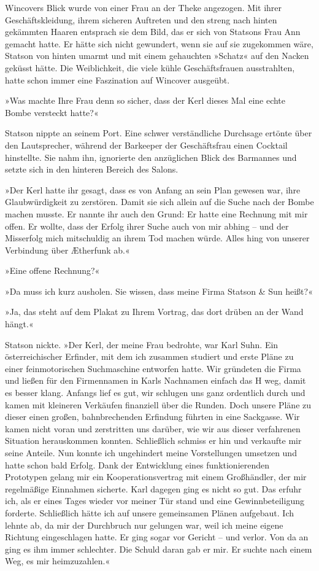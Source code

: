 \bigpar

Wincovers Blick wurde von einer Frau an der Theke angezogen. Mit
ihrer Geschäftskleidung, ihrem sicheren Auftreten und den streng
nach hinten gekämmten Haaren entsprach sie dem Bild, das er sich
von Statsons Frau Ann gemacht hatte. Er hätte sich nicht gewundert,
wenn sie auf sie zugekommen wäre, Statson von hinten umarmt und mit
einem gehauchten »Schatz« auf den Nacken geküsst hätte. Die
Weiblichkeit, die viele kühle Geschäftsfrauen ausstrahlten, hatte
schon immer eine Faszination auf Wincover ausgeübt.

»Was machte Ihre Frau denn so sicher, dass der Kerl dieses Mal eine
echte Bombe versteckt hatte?«

Statson nippte an seinem Port. Eine schwer verständliche Durchsage
ertönte über den Lautsprecher, während der Barkeeper der
Geschäftsfrau einen Cocktail hinstellte. Sie nahm ihn, ignorierte
den anzüglichen Blick des Barmannes und setzte sich in den hinteren
Bereich des Salons.

»Der Kerl hatte ihr gesagt, dass es von Anfang an sein Plan gewesen
war, ihre Glaubwürdigkeit zu zerstören. Damit sie sich allein auf
die Suche nach der Bombe machen musste. Er nannte ihr auch den
Grund: Er hatte eine Rechnung mit mir offen. Er wollte, dass der
Erfolg ihrer Suche auch von mir abhing – und der Misserfolg mich
mitschuldig an ihrem Tod machen würde. Alles hing von unserer
Verbindung über Ætherfunk ab.«

»Eine offene Rechnung?«

»Da muss ich kurz ausholen. Sie wissen, dass meine Firma Statson \&
Sun heißt?«

»Ja, das steht auf dem Plakat zu Ihrem Vortrag, das dort drüben an
der Wand hängt.«

Statson nickte. »Der Kerl, der meine Frau bedrohte, war Karl Suhn.
Ein österreichischer Erfinder, mit dem ich zusammen studiert und
erste Pläne zu einer feinmotorischen Suchmaschine entworfen hatte.
Wir gründeten die Firma und ließen für den Firmennamen in Karls
Nachnamen einfach das H weg, damit es besser klang. Anfangs lief es
gut, wir schlugen uns ganz ordentlich durch und kamen mit kleineren
Verkäufen finanziell über die Runden. Doch unsere Pläne zu dieser
einen großen, bahnbrechenden Erfindung führten in eine Sackgasse.
Wir kamen nicht voran und zerstritten uns darüber, wie wir aus
dieser verfahrenen Situation herauskommen konnten. Schließlich
schmiss er hin und verkaufte mir seine Anteile. Nun konnte ich
ungehindert meine Vorstellungen umsetzen und hatte schon bald
Erfolg. Dank der Entwicklung eines funktionierenden Prototypen
gelang mir ein Kooperationsvertrag mit einem Großhändler, der mir
regelmäßige Einnahmen sicherte. Karl dagegen ging es nicht so gut.
Das erfuhr ich, als er eines Tages wieder vor meiner Tür stand und
eine Gewinnbeteiligung forderte. Schließlich hätte ich auf unsere
gemeinsamen Plänen aufgebaut. Ich lehnte ab, da mir der Durchbruch
nur gelungen war, weil ich meine eigene Richtung eingeschlagen
hatte. Er ging sogar vor Gericht – und verlor. Von da an ging es
ihm immer schlechter. Die Schuld daran gab er mir. Er suchte nach
einem Weg, es mir heimzuzahlen.«


